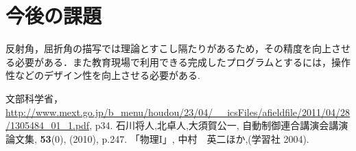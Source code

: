 \documentclass[a4j,twocolumn,uplatex]{jarticle}
\begin{document}
\vspace{-2em}
\section{今後の課題}
\vspace{-0.5em}
反射角，屈折角の描写では理論とすこし隔たりがあるため，その精度を向上させる必要がある．また教育現場で利用できる完成したプログラムとするには，操作性などのデザイン性を向上させる必要がある.
\vspace{-5mm}
\begin{thebibliography}{9}
 文部科学省，\url{http://www.mext.go.jp/b_menu/houdou/23/04/__icsFiles/afieldfile/2011/04/28/1305484_01_1.pdf}, p34.
 石川将人,北卓人,大須賀公一, 自動制御連合講演会講演論文集, {\bf 53}(0), (2010), p.247.
 「物理I」, 中村　英二ほか,(学習社 2004).
\end{thebibliography}
\end{document}
